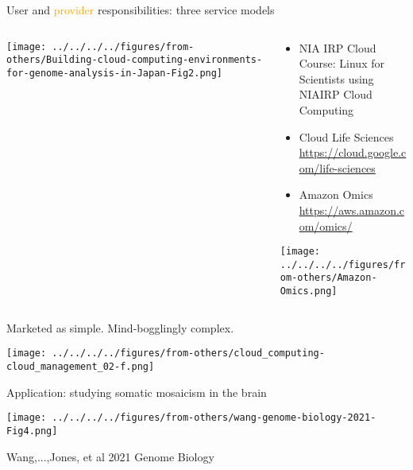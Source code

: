 \documentclass[aspectratio=169]{beamer}
\begin{document}
\begin{frame}{\textcolor{BlueGreen}{User} and \textcolor{orange}{provider}
  responsibilities: three service models}
\begin{columns}[t]
\begin{column}{0.5\textwidth}

\texttt{[image: ../../../../figures/from-others/Building-cloud-computing-environments-for-genome-analysis-in-Japan-Fig2.png]}
\end{column}

\begin{column}{0.5\textwidth}
  \begin{itemize}
    \item NIA IRP Cloud\\
      {\footnotesize Course: Linux for Scientists using NIAIRP Cloud Computing}
    \item Cloud Life Sciences\\
    {\footnotesize \url{https://cloud.google.com/life-sciences}}
    \item Amazon Omics\\
      {\footnotesize \url{https://aws.amazon.com/omics/}}
  \end{itemize}

\texttt{[image: ../../../../figures/from-others/Amazon-Omics.png]}
\end{column}
\end{columns}
\end{frame}

\begin{frame}{Marketed as simple. Mind-bogglingly complex.}
\begin{center}
\texttt{[image: ../../../../figures/from-others/cloud\_computing-cloud\_management\_02-f.png]}
\end{center}
\end{frame}

\begin{frame}{Application: studying somatic mosaicism in the brain}
\begin{center}
\texttt{[image: ../../../../figures/from-others/wang-genome-biology-2021-Fig4.png]}

{\tiny Wang,...,Jones, et al 2021 Genome Biology}
\end{center}
\end{frame}
\end{document}
